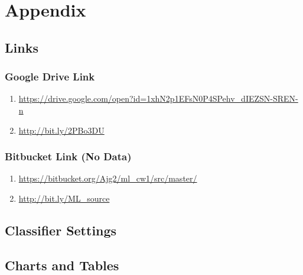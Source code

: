 \section{Appendix}
\label{sec:appendix}

\subsection{Links}
\label{sec:appendix:links}

\subsubsection{Google Drive Link}
\label{sec:appenfix:links:gdrive}
\begin{enumerate}
    \item \url{https://drive.google.com/open?id=1xhN2p1EFsN0P4SPehv_dIEZSN-SREN-n}
    \item \url{http://bit.ly/2PBo3DU} 
\end{enumerate}

\subsubsection{Bitbucket Link (No Data)}
\label{sec:appenfix:links:bitbucket}
\begin{enumerate}
    \item \url{https://bitbucket.org/Ajg2/ml_cw1/src/master/}
    \item \url{http://bit.ly/ML\_source} 
\end{enumerate}

\subsection{Classifier Settings}
\label{sec:appendix:classifier}


\subsection{Charts and Tables}
\label{sec:appendix:charts_tables}

